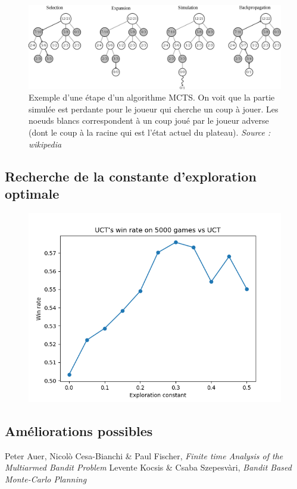 \documentclass[a4paper]{article}
\theoremstyle{definition}
\begin{document}
\begin{figure}[h]
\centering
\includegraphics[scale=0.18]{MCTS_wikipedia.png}
\caption{Exemple d'une étape d'un algorithme MCTS. On voit que la partie simulée est perdante pour le joueur qui cherche un coup à jouer. Les noeuds blancs correspondent à un coup joué par le joueur adverse (dont le coup à la racine qui est l'état actuel du plateau). \textit{Source : wikipedia}}
\end{figure}

\subsection{Recherche de la constante d'exploration optimale}



\begin{figure}[h]
\centering
\includegraphics[scale=0.7]{test2.png}
\caption{}
\end{figure}

\subsection{Améliorations possibles}

\clearpage
%
\begin{thebibliography}{9}

Peter Auer, Nicol\`o Cesa-Bianchi \& Paul Fischer, {\em Finite time Analysis of the Multiarmed Bandit Problem}
Levente Kocsis \& Csaba Szepesv\`ari, {\em Bandit Based Monte-Carlo Planning}

\end{thebibliography}
\end{document}
